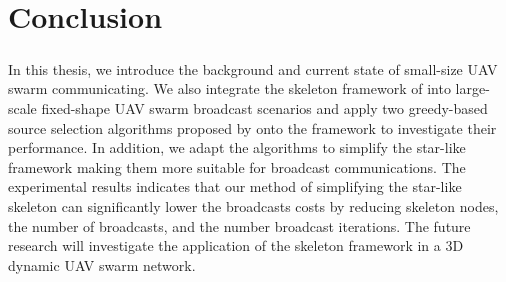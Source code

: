 \documentclass[a4paper,12pt]{report}
\begin{document}



\chapter{Conclusion}
\paragraph{}
In this thesis, we introduce the background and current state of small-size UAV swarm communicating. We also integrate the skeleton framework of \cite{ssr} into large-scale fixed-shape UAV swarm broadcast scenarios and apply two greedy-based source selection algorithms proposed by \cite{prose} onto the framework to investigate their performance. In addition, we adapt the algorithms to simplify the star-like framework making them more suitable for broadcast communications. The experimental results indicates that our method of simplifying the star-like skeleton can significantly lower the broadcasts costs by reducing skeleton nodes, the number of broadcasts, and the number broadcast iterations. The future research will investigate the application of the skeleton framework in a 3D dynamic UAV swarm network.


\newpage
{}


\end{document}
